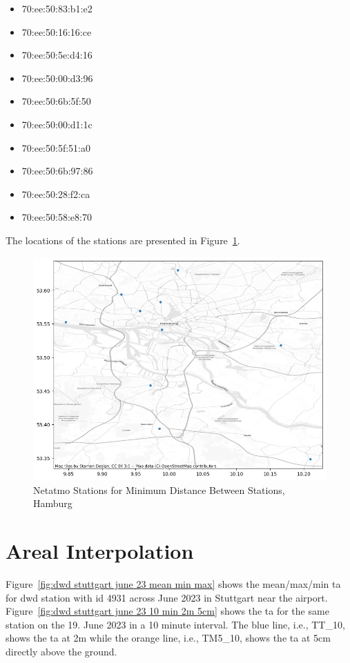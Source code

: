 \begin{itemize}
    \item 70:ee:50:83:b1:e2 
    \item 70:ee:50:16:16:ce
    \item 70:ee:50:5e:d4:16
    \item 70:ee:50:00:d3:96
    \item 70:ee:50:6b:5f:50
    \item 70:ee:50:00:d1:1c
    \item 70:ee:50:5f:51:a0
    \item 70:ee:50:6b:97:86
    \item 70:ee:50:28:f2:ca
    \item 70:ee:50:58:e8:70
\end{itemize}

The locations of the stations are presented in Figure~\ref{fig:eval_hamburg_locations_point_histb_10_map}.

\begin{figure}[ht]
    \centering
    \includegraphics[width=1\textwidth]{images/eval_hamburg_locations_point_histb_10_map.png}
    \caption{Netatmo Stations for Minimum Distance Between Stations, Hamburg}
    \label{fig:eval_hamburg_locations_point_histb_10_map}
\end{figure}

\section{Areal Interpolation}

Figure~\ref{fig:dwd stuttgart june 23 mean min max} shows the mean/max/min \gls{ta} for \gls{dwd} station with id 4931 across June 2023 in Stuttgart near the airport.
Figure~\ref{fig:dwd stuttgart june 23 10 min 2m 5cm} shows the \gls{ta} for the same station on the 19. June 2023 in a 10 minute interval. The blue line, i.e., TT\_10, shows the \gls{ta} at 2m while the orange line, i.e., TM5\_10, shows the \gls{ta} at 5cm directly above the ground.

